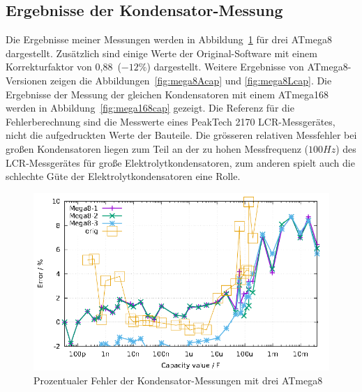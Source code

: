 \subsection{Ergebnisse der Kondensator-Messung}
Die Ergebnisse meiner Messungen werden in Abbildung~\ref{fig:mega8cap} für drei ATmega8 dargestellt.
Zusätzlich sind einige Werte der Original-Software mit einem Korrekturfaktor
von 0,88~(\(-12\%\)) dargestellt.
Weitere Ergebnisse von ATmega8-Versionen zeigen die Abbildungen~\ref{fig:mega8Acap} und \ref{fig:mega8Lcap}.
Die Ergebnisse der Messung der gleichen Kondensatoren mit einem ATmega168 werden in Abbildung~\ref{fig:mega168cap} gezeigt.
Die Referenz für die Fehlerberechnung sind die Messwerte eines PeakTech 2170 LCR-Messgerätes, 
 nicht die aufgedruckten Werte der Bauteile.
Die grösseren relativen Messfehler bei großen Kondensatoren liegen zum Teil an der zu hohen Messfrequenz (\(100Hz\)) des
LCR-Messgerätes für große Elektrolytkondensatoren, zum anderen spielt auch die schlechte Güte der
Elektrolytkondensatoren eine Rolle.

\begin{figure}[H]
\centering
\includegraphics[width=16cm]{../GNU/Mega8cap.pdf}
\caption{Prozentualer Fehler der Kondensator-Messungen mit drei ATmega8}
\label{fig:mega8cap}
\end{figure}

